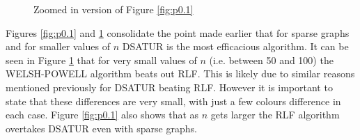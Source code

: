 \begin{figure}[H]
    \centering

  \caption{Zoomed in version of Figure \ref{fig:p0.1}}
    \label{fig:p0.1zoom}
\end{figure}  

Figures \ref{fig:p0.1} and \ref{fig:p0.1zoom} consolidate the point made earlier that for sparse graphs and for smaller values of $n$ DSATUR is the most efficacious algorithm. It can be seen in Figure \ref{fig:p0.1zoom} that for very small values of $n$ (i.e. between 50 and 100) the WELSH-POWELL algorithm beats out RLF. This is likely due to similar reasons mentioned previously for DSATUR beating RLF. However it is important to state that these differences are very small, with just a few colours difference in each case. Figure \ref{fig:p0.1} also shows that as $n$ gets larger the RLF algorithm overtakes DSATUR even with sparse graphs. 


